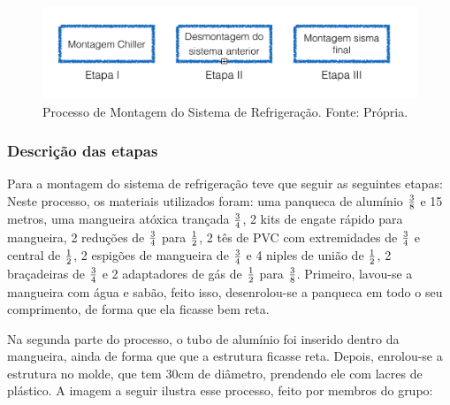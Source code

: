                 \begin{figure}[!htb]
            		\centering
            		\includegraphics[scale= 0.3]{figuras/montagem-chiler.png}
            		\caption{Processo de Montagem do Sistema de Refrigeração. Fonte: Própria.}
            		\label{simulacao-refrigeracao}
            	\end{figure}
                
                \subsubsection[Descrição das etapas]{Descrição das etapas}
                    Para a montagem do sistema de refrigeração teve que seguir as seguintes etapas:                    
                        Neste processo, os materiais utilizados foram: uma panqueca de alumínio $3 \over 8$ e
                        15 metros, uma mangueira atóxica trançada $3 \over 4$, 2 kits de engate rápido para
                        mangueira, 2  reduções de $3 \over 4$ para $1 \over 2$, 2 tês de PVC com extremidades de $3 \over 4$
                        e central de $1 \over 2$, 2 espigões de mangueira de $3 \over 4$ e 4 niples de união de $1 \over 2$,
                        2 braçadeiras de $3 \over 4$ e 2 adaptadores de gás de $1 \over 2$ para $3 \over 8$.
                        Primeiro, lavou-se a mangueira com água e sabão, feito isso,
                        desenrolou-se a panqueca em todo o seu comprimento, de forma que ela
                        ficasse bem reta. 
                        
                        Na segunda parte do processo, o tubo de alumínio foi inserido dentro da
                        mangueira, ainda de forma que que a estrutura ficasse reta. Depois,
                        enrolou-se a estrutura no molde, que tem 30cm de diâmetro, prendendo
                        ele com lacres de plástico. A imagem a seguir ilustra esse processo,
                        feito por membros do grupo:

